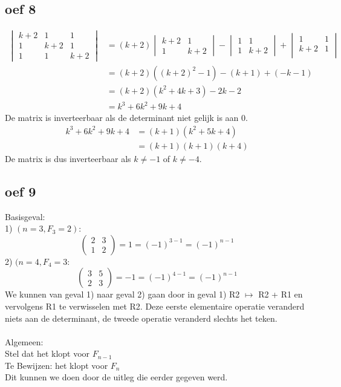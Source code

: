 \documentclass[10pt,a4paper]{article}
\begin{document}
\subsection*{oef 8}
\begin{align*}
    \begin{vmatrix}
        k+2 & 1 & 1\\
        1 & k+2 & 1\\
        1 & 1 & k+2
    \end{vmatrix}
    &= (k+2) 
    \begin{vmatrix}
        k+2 & 1\\
        1 & k+2    
    \end{vmatrix} - 
    \begin{vmatrix}
        1 & 1\\
        1 & k+2
    \end{vmatrix} + 
    \begin{vmatrix}
        1 & 1\\
        k+2 & 1\\
    \end{vmatrix}\\
    &= (k+2)((k+2)^2 - 1) - (k+1) + (-k-1)\\
    &= (k+2)(k^2 + 4k + 3) -2k - 2\\
    &= k^3 + 6k^2 + 9k + 4
\end{align*}
De matrix is inverteerbaar als de determinant niet gelijk is aan 0.
\begin{align*}
    k^3 + 6k^2 + 9k + 4 &= (k+1)(k^2 + 5k + 4)\\
    &= (k+1)(k+1)(k+4)
\end{align*}
De matrix is dus inverteerbaar als $k \neq -1$ of $k \neq -4$.

\subsection*{oef 9}
Basisgeval: \\
1) $(n=3, F_{3}=2):$
\[ 
\begin{pmatrix}
2 & 3\\ 
1 & 2
\end{pmatrix}
= 1 = (-1)^{3-1} = (-1)^{n-1}
\]
2) $(n=4, F_{4}=3:$
\[
\begin{pmatrix}
3 & 5\\ 
2 & 3
\end{pmatrix}
= -1 = (-1)^{4-1} = (-1)^{n-1}
\]
We kunnen van geval 1) naar geval 2) gaan door in geval 1) R2 $\longmapsto $ R2 + R1 en vervolgens R1 te verwisselen met R2. Deze eerste elementaire operatie veranderd niets aan de determinant, de tweede operatie veranderd slechts het teken. \\
\\
Algemeen:\\
Stel dat het klopt voor $F_{n-1}$\\
Te Bewijzen: het klopt voor $F_{n}$\\
Dit kunnen we doen door de uitleg die eerder gegeven werd.
\end{document}
